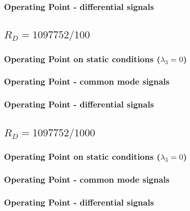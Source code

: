 \subsubsection{Operating Point - differential signals}



\subsection{$R_D = 1097752/100$}
\subsubsection{Operating Point on static conditions ($\lambda_3 = 0$)}



\subsubsection{Operating Point - common mode signals}



\subsubsection{Operating Point - differential signals}



\subsection{$R_D = 1097752/1000$}
\subsubsection{Operating Point on static conditions ($\lambda_3 = 0$)}



\subsubsection{Operating Point - common mode signals}



\subsubsection{Operating Point - differential signals}


